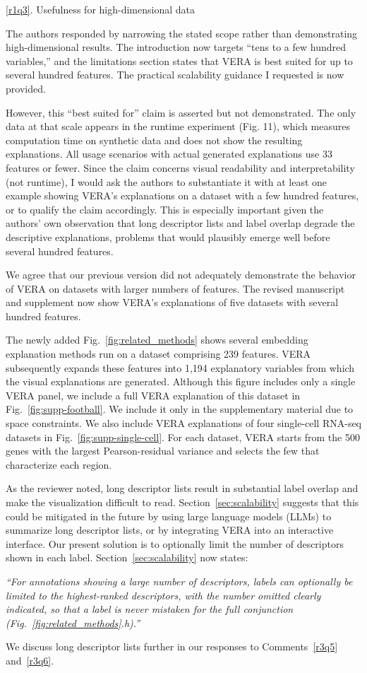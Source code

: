 \documentclass[11pt]{article}
\newcounter{rtaskno}
\newcommand{\rtask}[1]{\refstepcounter{rtaskno}\label{#1}}
\newcommand{\reviewc}[2]{\begin{leftbar}\noindent\rtask{#1}\ref{#1}. #2\end{leftbar}\vspace*{-4mm}}
\newcommand{\answer}[1]{\noindent #1\par\vspace{2mm}}
\newcommand{\copyquote}[1]{\vspace{1mm} {\itshape ``#1''}\vspace{1mm}}
\newlength{\leftbarwidth}
\newlength{\leftbarsep}
\renewenvironment{leftbar}{%
    \def\FrameCommand{{\color{black}{\vrule width \leftbarwidth\relax\hspace {\leftbarsep}}}}%
    \MakeFramed {\advance \hsize -\width \FrameRestore }%
}{\endMakeFramed}
\begin{document}
\reviewc{r1q3}{Usefulness for high-dimensional data

The authors responded by narrowing the stated scope rather than demonstrating high-dimensional results. The introduction now targets ``tens to a few hundred variables,'' and the limitations section states that VERA is best suited for up to several hundred features. The practical scalability guidance I requested is now provided.

However, this ``best suited for'' claim is asserted but not demonstrated. The only data at that scale appears in the runtime experiment (Fig. 11), which measures computation time on synthetic data and does not show the resulting explanations. All usage scenarios with actual generated explanations use 33 features or fewer. Since the claim concerns visual readability and interpretability (not runtime), I would ask the authors to substantiate it with at least one example showing VERA's explanations on a dataset with a few hundred features, or to qualify the claim accordingly. This is especially important given the authors' own observation that long descriptor lists and label overlap degrade the descriptive explanations, problems that would plausibly emerge well before several hundred features.}

\answer{%
We agree that our previous version did not adequately demonstrate the behavior of VERA on datasets with larger numbers of features. The revised manuscript and supplement now show VERA's explanations of five datasets with several hundred features.

The newly added Fig.~\ref{fig:related_methods} shows several embedding explanation methods run on a dataset comprising 239 features. VERA subsequently expands these features into 1,194 explanatory variables from which the visual explanations are generated. Although this figure includes only a single VERA panel, we include a full VERA explanation of this dataset in Fig.~\ref{fig:supp-football}. We include it only in the supplementary material due to space constraints. We also include VERA explanations of four single-cell RNA-seq datasets in Fig.~\ref{fig:supp-single-cell}. For each dataset, VERA starts from the 500 genes with the largest Pearson-residual variance and selects the few that characterize each region.

As the reviewer noted, long descriptor lists result in substantial label overlap and make the visualization difficult to read.
Section~\ref{sec:scalability} suggests that this could be mitigated in the future by using large language models (LLMs) to summarize long descriptor lists, or by integrating VERA into an interactive interface.
Our present solution is to optionally limit the number of descriptors shown in each label. Section~\ref{sec:scalability} now states:

\copyquote{For annotations showing a large number of descriptors, labels can optionally be limited to the highest-ranked descriptors, with the number omitted clearly indicated, so that a label is never mistaken for the full conjunction (Fig.~\ref{fig:related_methods}.h).}

We discuss long descriptor lists further in our responses to Comments~\ref{r3q5} and~\ref{r3q6}.
}
\end{document}
